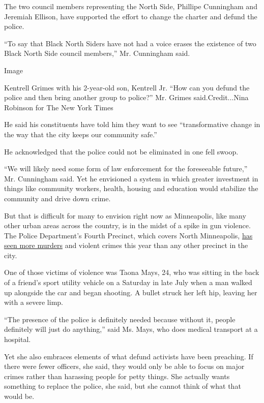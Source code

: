 The two council members representing the North Side, Phillipe Cunningham
and Jeremiah Ellison, have supported the effort to change the charter
and defund the police.

``To say that Black North Siders have not had a voice erases the
existence of two Black North Side council members,'' Mr. Cunningham
said.

Image

Kentrell Grimes with his 2-year-old son, Kentrell Jr. ``How can you
defund the police and then bring another group to police?'' Mr. Grimes
said.Credit...Nina Robinson for The New York Times

He said his constituents have told him they want to see ``transformative
change in the way that the city keeps our community safe.''

He acknowledged that the police could not be eliminated in one fell
swoop.

``We will likely need some form of law enforcement for the foreseeable
future,'' Mr. Cunningham said. Yet he envisioned a system in which
greater investment in things like community workers, health, housing and
education would stabilize the community and drive down crime.

But that is difficult for many to envision right now as Minneapolis,
like many other urban areas across the country, is in the midst of a
spike in gun violence. The Police Department's Fourth Precinct, which
covers North Minneapolis,
\href{https://tableau.minneapolismn.gov/views/MPDMStatCrimeData/CrimeDashboard-byDate?\%3Aembed=y\&\%3AshowAppBanner=false\&\%3AshowShareOptions=true\&\%3Adisplay_count=no\&\%3AshowVizHome=no}{has
seen more murders} and violent crimes this year than any other precinct
in the city.

One of those victims of violence was Taona Mays, 24, who was sitting in
the back of a friend's sport utility vehicle on a Saturday in late July
when a man walked up alongside the car and began shooting. A bullet
struck her left hip, leaving her with a severe limp.

``The presence of the police is definitely needed because without it,
people definitely will just do anything,'' said Ms. Mays, who does
medical transport at a hospital.

Yet she also embraces elements of what defund activists have been
preaching. If there were fewer officers, she said, they would only be
able to focus on major crimes rather than harassing people for petty
things. She actually wants something to replace the police, she said,
but she cannot think of what that would be.

